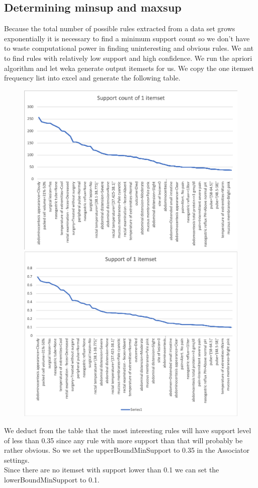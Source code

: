 \subsection{Determining minsup and maxsup}

Because the total number of possible rules extracted
from a data set grows exponentially it is necessary to find a minimum support count so we don't have to waste computational power in finding uninteresting and obvious rules.
We ant to find rules with relatively low support and high confidence.
We run the apriori algorithm and let weka generate output itemsets for us.  We copy the one itemset frequency list into excel and generate the following table.


\begin{figure}[h!]
\includegraphics[scale=0.7]{SupportCountTable.png}

\includegraphics[scale=0.7]{SupportTable.png}
\end{figure}

We deduct from the table that the most interesting rules will have support level of less than 0.35 since any rule with more support than that will probably be rather obvious. So we set the upperBoundMinSupport to 0.35 in the Associator settings.\\
Since there are no itemset with support lower than 0.1 we can set the lowerBoundMinSupport to 0.1.